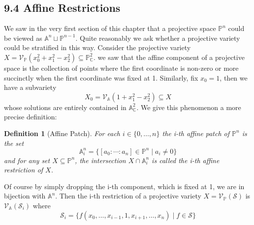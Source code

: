 \documentclass[40pt]{article}
\newtheorem{definition}{Definition}[section]
\newcommand{\mcal}[1]{\mathcal{#1}}
\newcommand{\Proj}{\mathbb{P}}
\newcommand{\C}{\mathbb{C}}
\newcommand{\A}{\mathbb{A}}
\newcommand{\V}{\mathcal{V}}
\theoremstyle{remark}
\begin{document}
\subsection{9.4 Affine Restrictions}
	We saw in the very first section of this chapter that a projective space $\Proj^n$ could be viewed as $\A^n \sqcup \Proj^{n-1}$. Quite reasonably we ask whether a projective variety could be stratified in this way. Consider the projective variety $X = \V_\Proj(x_0^2 + x_1^2 - x_2^2) \subseteq \Proj_\C^2$. we saw that the affine component of a projective space is the collection of points where the first coordinate is non-zero or more succinctly when the first coordinate was fixed at 1. Similarly, fix $x_0 = 1$, then we have a subvariety
	\[
	X_0 = \V_\A(1+x_1^2 - x_2^2) \subseteq X
	\]
	whose solutions are entirely contained in $\A^2_\C$. We give this phenomenon a more precise definition:
	\begin{definition}[Affine Patch]
		For each $i \in \{0,\dots,n\}$ the i-th affine patch of $\Proj^n$ is the set
		\[
		\A^n_i = \{[a_0:\cdots:a_n]\in\Proj^n \; | \; a_i \neq 0\}
		\]
		and for any set $X \subseteq \Proj^n$, the intersection $X \cap \A^n_i$ is called the i-th affine restriction of $X$. 
	\end{definition}
	Of course by simply dropping the i-th component, which is fixed at 1, we are in bijection with $\A^n$. Then the i-th restriction of a projective variety $X = \V_\Proj(\mcal{S})$ is $\V_\A(\mcal{S}_i)$ where 
	\[
	\mcal{S}_i = \{f(x_0,\dots,x_{i-1},1,x_{i+1},\dots,x_n) \; | \; f \in \mcal{S}\}
	\]
\end{document}
